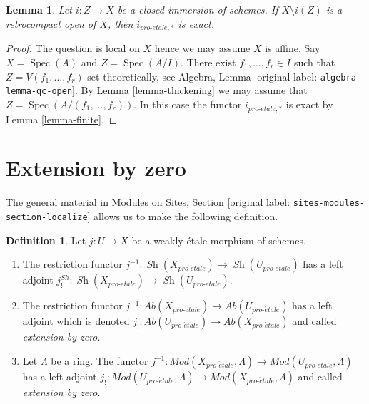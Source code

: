 \documentclass[10pt,a4paper]{article}
\theoremstyle{plain}
\newtheorem{lemma}[subsection]{Lemma}
\theoremstyle{definition}
\newtheorem{definition}[subsection]{Definition}
\theoremstyle{remark}
\numberwithin{equation}{subsection}
\def\Spec{\mathop{\mathrm{Spec}}}
\def\Sh{\mathop{\mathit{Sh}}\nolimits}
\def\proetale{{pro\text{-}\acute{e}tale}}
\begin{document}
\begin{lemma}
\label{lemma-closed-immersion-complement-retrocompact-exact}
Let $i : Z \to X$ be a closed immersion of schemes.
If $X \setminus i(Z)$ is a retrocompact open of $X$, then
$i_{\proetale, *}$ is exact.
\end{lemma}

\begin{proof}
The question is local on $X$ hence we may assume $X$ is affine.
Say $X = \Spec(A)$ and $Z = \Spec(A/I)$. There exist
$f_1, \ldots, f_r \in I$ such that $Z = V(f_1, \ldots, f_r)$
set theoretically, see Algebra, Lemma \textnormal{[original label: \nolinkurl{algebra-lemma-qc-open}]}.
By Lemma \ref{lemma-thickening} we may assume that
$Z = \Spec(A/(f_1, \ldots, f_r))$. In this case
the functor $i_{\proetale, *}$ is exact by
Lemma \ref{lemma-finite}.
\end{proof}





\section{Extension by zero}
\label{section-extension-by-zero}

\noindent
The general material in
Modules on Sites, Section \textnormal{[original label: \nolinkurl{sites-modules-section-localize}]}
allows us to make the following definition.

\begin{definition}
\label{definition-extension-zero}
Let $j : U \to X$ be a weakly \'etale morphism of schemes.
\begin{enumerate}
\item The restriction functor
$j^{-1} : \Sh(X_\proetale) \to \Sh(U_\proetale)$
has a left adjoint
$j_!^{Sh} : \Sh(X_\proetale) \to \Sh(U_\proetale)$.
\item The restriction functor
$j^{-1} : \textit{Ab}(X_\proetale) \to \textit{Ab}(U_\proetale)$
has a left adjoint which is denoted
$j_! : \textit{Ab}(U_\proetale) \to \textit{Ab}(X_\proetale)$
and called {\it extension by zero}.
\item Let $\Lambda$ be a ring. The functor
$j^{-1} : \textit{Mod}(X_\proetale, \Lambda) \to
\textit{Mod}(U_\proetale, \Lambda)$
has a left adjoint
$j_! : \textit{Mod}(U_\proetale, \Lambda) \to
\textit{Mod}(X_\proetale, \Lambda)$
and called {\it extension by zero}.
\end{enumerate}
\end{definition}
\end{document}
